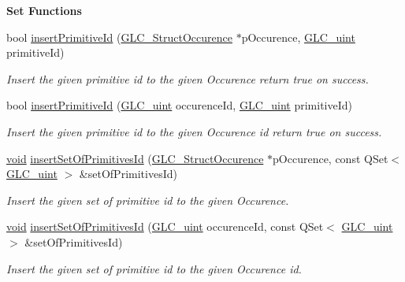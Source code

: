 \begin{Indent}{\bf Set Functions}
\begin{DoxyCompactItemize}
bool \hyperlink{class_g_l_c___selection_set_a4153efb3524bdf1aac2d6dcfec021926}{insert\-Primitive\-Id} (\hyperlink{class_g_l_c___struct_occurence}{G\-L\-C\-\_\-\-Struct\-Occurence} $\ast$p\-Occurence, \hyperlink{glc__global_8h_abf950976fabed69026558df8e2da6c6b}{G\-L\-C\-\_\-uint} primitive\-Id)
\begin{DoxyCompactList}\small\item\em Insert the given primitive id to the given Occurence return true on success. \end{DoxyCompactList}\item 
bool \hyperlink{class_g_l_c___selection_set_ab4b6a99ac91fcf3c29f25034469212da}{insert\-Primitive\-Id} (\hyperlink{glc__global_8h_abf950976fabed69026558df8e2da6c6b}{G\-L\-C\-\_\-uint} occurence\-Id, \hyperlink{glc__global_8h_abf950976fabed69026558df8e2da6c6b}{G\-L\-C\-\_\-uint} primitive\-Id)
\begin{DoxyCompactList}\small\item\em Insert the given primitive id to the given Occurence id return true on success. \end{DoxyCompactList}\item 
\hyperlink{group___u_a_v_objects_plugin_ga444cf2ff3f0ecbe028adce838d373f5c}{void} \hyperlink{class_g_l_c___selection_set_a697260456e6a7babbbb5bafcd3593590}{insert\-Set\-Of\-Primitives\-Id} (\hyperlink{class_g_l_c___struct_occurence}{G\-L\-C\-\_\-\-Struct\-Occurence} $\ast$p\-Occurence, const Q\-Set$<$ \hyperlink{glc__global_8h_abf950976fabed69026558df8e2da6c6b}{G\-L\-C\-\_\-uint} $>$ \&set\-Of\-Primitives\-Id)
\begin{DoxyCompactList}\small\item\em Insert the given set of primitive id to the given Occurence. \end{DoxyCompactList}\item 
\hyperlink{group___u_a_v_objects_plugin_ga444cf2ff3f0ecbe028adce838d373f5c}{void} \hyperlink{class_g_l_c___selection_set_a25ee934e0ec7ec49eacd1f7db06fe275}{insert\-Set\-Of\-Primitives\-Id} (\hyperlink{glc__global_8h_abf950976fabed69026558df8e2da6c6b}{G\-L\-C\-\_\-uint} occurence\-Id, const Q\-Set$<$ \hyperlink{glc__global_8h_abf950976fabed69026558df8e2da6c6b}{G\-L\-C\-\_\-uint} $>$ \&set\-Of\-Primitives\-Id)
\begin{DoxyCompactList}\small\item\em Insert the given set of primitive id to the given Occurence id. \end{DoxyCompactList}\item 

\end{DoxyCompactItemize}
\end{Indent}

